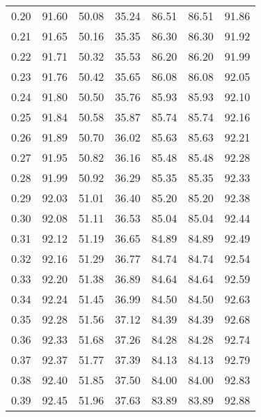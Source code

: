 \begin{tabular}{|c|c|c|c|c|c|c|}
      0.20 &     91.60 &     50.08 &      35.24 &   86.51 &      86.51 &         91.86 \\
      0.21 &     91.65 &     50.16 &      35.35 &   86.30 &      86.30 &         91.92 \\
      0.22 &     91.71 &     50.32 &      35.53 &   86.20 &      86.20 &         91.99 \\
      0.23 &     91.76 &     50.42 &      35.65 &   86.08 &      86.08 &         92.05 \\
      0.24 &     91.80 &     50.50 &      35.76 &   85.93 &      85.93 &         92.10 \\
      0.25 &     91.84 &     50.58 &      35.87 &   85.74 &      85.74 &         92.16 \\
      0.26 &     91.89 &     50.70 &      36.02 &   85.63 &      85.63 &         92.21 \\
      0.27 &     91.95 &     50.82 &      36.16 &   85.48 &      85.48 &         92.28 \\
      0.28 &     91.99 &     50.92 &      36.29 &   85.35 &      85.35 &         92.33 \\
      0.29 &     92.03 &     51.01 &      36.40 &   85.20 &      85.20 &         92.38 \\
      0.30 &     92.08 &     51.11 &      36.53 &   85.04 &      85.04 &         92.44 \\
      0.31 &     92.12 &     51.19 &      36.65 &   84.89 &      84.89 &         92.49 \\
      0.32 &     92.16 &     51.29 &      36.77 &   84.74 &      84.74 &         92.54 \\
      0.33 &     92.20 &     51.38 &      36.89 &   84.64 &      84.64 &         92.59 \\
      0.34 &     92.24 &     51.45 &      36.99 &   84.50 &      84.50 &         92.63 \\
      0.35 &     92.28 &     51.56 &      37.12 &   84.39 &      84.39 &         92.68 \\
      0.36 &     92.33 &     51.68 &      37.26 &   84.28 &      84.28 &         92.74 \\
      0.37 &     92.37 &     51.77 &      37.39 &   84.13 &      84.13 &         92.79 \\
      0.38 &     92.40 &     51.85 &      37.50 &   84.00 &      84.00 &         92.83 \\
      0.39 &     92.45 &     51.96 &      37.63 &   83.89 &      83.89 &         92.88 \\

\end{tabular}
